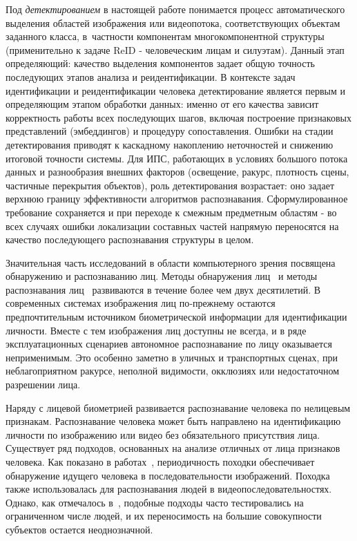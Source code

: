 Под \textit{детектированием} в настоящей работе понимается процесс
автоматического выделения областей изображения или видеопотока,
соответствующих объектам заданного класса, в~частности компонентам
многокомпонентной структуры (применительно к задаче ReID - человеческим
лицам и силуэтам). Данный этап определяющий: качество выделения
компонентов задает общую точность последующих этапов анализа
и реидентификации. В контексте задач идентификации и реидентификации
человека детектирование является первым и определяющим этапом обработки данных:
именно от его качества зависит корректность работы всех последующих шагов,
включая построение признаковых представлений (эмбеддингов) и процедуру
сопоставления. Ошибки на стадии детектирования приводят к каскадному
накоплению неточностей и снижению итоговой точности системы. Для ИПС,
работающих в условиях большого потока данных и разнообразия внешних
факторов (освещение, ракурс, плотность сцены, частичные перекрытия
объектов), роль детектирования возрастает: оно задает верхнюю
границу эффективности алгоритмов распознавания. Сформулированное
требование сохраняется и при переходе к смежным предметным областям -
во всех случаях ошибки локализации составных частей напрямую переносятся
на качество последующего распознавания структуры в целом.

Значительная часть исследований в области компьютерного зрения посвящена
обнаружению и распознаванию лиц. Методы обнаружения лиц~\cite{Shanmugavadivu2016facedetect,Hofer2021faceparts,He2020crossspectral,Li2006nirface,Zhang2004infofusion,CLiu2014face} и
методы распознавания лиц~\cite{Zhao2011facecorner,Dang2017facedetection,Tian2012faceJPEG,Nehru2017violajones,CLiu2014face} развиваются в течение более
чем двух десятилетий. В современных системах изображения лиц по‑прежнему
остаются предпочтительным источником биометрической информации для
идентификации личности. Вместе с тем изображения лиц доступны не всегда, и в ряде эксплуатационных
сценариев автономное распознавание по лицу оказывается неприменимым. Это особенно заметно в уличных и транспортных сценах, при
неблагоприятном ракурсе, неполной видимости, окклюзиях или недостаточном
разрешении лица.

Наряду с лицевой биометрией развивается распознавание человека по нелицевым
признакам. Распознавание человека может быть направлено на идентификацию
личности по изображению или видео без обязательного присутствия лица.
Существует ряд подходов, основанных на анализе отличных от лица признаков
человека. Как показано в работах~\cite{Cutler2000periodicmotion,Heisele1998pedestrian}, периодичность походки обеспечивает
обнаружение идущего человека в последовательности изображений. Походка также
использовалась для распознавания людей в видеопоследовательностях. Однако, как
отмечалось в~\cite{Nixon1999gait}, подобные подходы часто тестировались на ограниченном числе
людей, и их переносимость на большие совокупности субъектов остается
неоднозначной.

